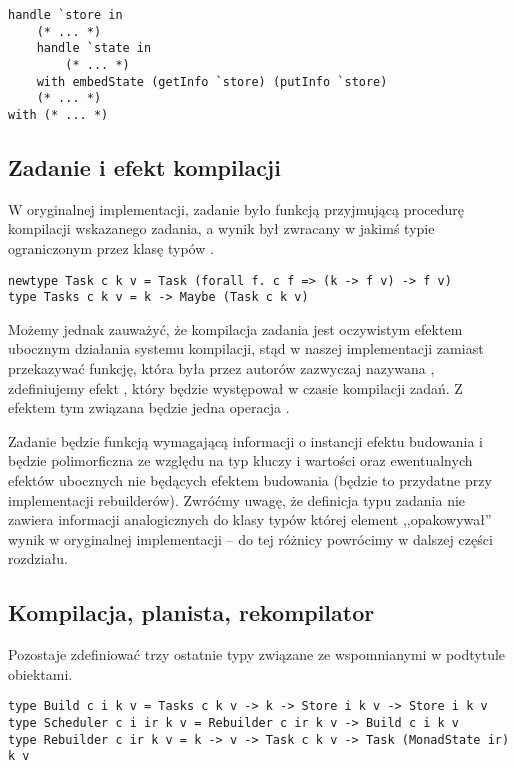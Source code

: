 \begin{lstlisting}[language=Haleff, float=h, title={Przykład wykorzystania \helinl{embedState}}]
handle `store in
    (* ... *)
    handle `state in
        (* ... *)
    with embedState (getInfo `store) (putInfo `store)
    (* ... *)
with (* ... *)
\end{lstlisting}

\subsection{Zadanie i efekt kompilacji}

W oryginalnej implementacji, zadanie było funkcją przyjmującą procedurę kompilacji wskazanego zadania, a wynik był zwracany w jakimś typie  ograniczonym przez klasę typów .

\begin{lstlisting}[style=haskell-style]
newtype Task c k v = Task (forall f. c f => (k -> f v) -> f v)
type Tasks c k v = k -> Maybe (Task c k v)
\end{lstlisting}

Możemy jednak zauważyć, że kompilacja zadania jest oczywistym efektem ubocznym działania systemu kompilacji, stąd w naszej implementacji zamiast przekazywać funkcję, która była przez autorów zazwyczaj nazywana , zdefiniujemy efekt , który będzie występował w czasie kompilacji zadań. Z efektem tym związana będzie jedna operacja .



Zadanie będzie funkcją wymagającą informacji o instancji efektu budowania i będzie polimorficzna ze względu na typ kluczy i wartości oraz ewentualnych efektów ubocznych nie będących efektem budowania (będzie to przydatne przy implementacji rebuilderów). Zwróćmy uwagę, że definicja typu zadania nie zawiera informacji analogicznych do klasy typów  której element  ,,opakowywał'' wynik w oryginalnej implementacji -- do tej różnicy powrócimy w dalszej części rozdziału.

\subsection{Kompilacja, planista, rekompilator}

Pozostaje zdefiniować trzy ostatnie typy związane ze wspomnianymi w podtytule obiektami.

\begin{lstlisting}[style=haskell-style]
type Build c i k v = Tasks c k v -> k -> Store i k v -> Store i k v
type Scheduler c i ir k v = Rebuilder c ir k v -> Build c i k v
type Rebuilder c ir k v = k -> v -> Task c k v -> Task (MonadState ir) k v
\end{lstlisting}

